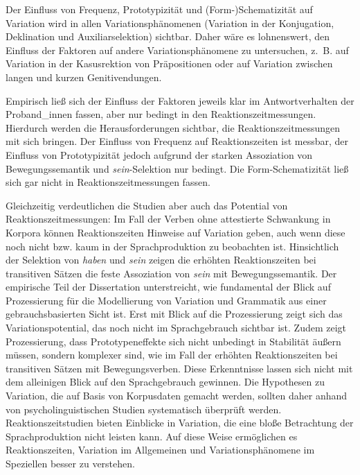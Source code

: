Der Einfluss von Frequenz, Prototypizität und (Form-)Schematizität auf Variation wird in allen Variationsphänomenen (Variation in der Konjugation, Deklination und Auxiliarselektion) sichtbar. Daher wäre es lohnenswert, den Einfluss der Faktoren auf andere Variationsphänomene zu untersuchen, z.~B. auf Variation in der Kasusrektion von Präpositionen oder auf Variation zwischen langen und kurzen Genitivendungen. 

Empirisch ließ sich der Einfluss der Faktoren jeweils klar im Antwortverhalten der Proband\_innen fassen, aber nur bedingt in den Reaktionszeitmessungen. Hierdurch werden die Herausforderungen sichtbar, die Reaktionszeitmessungen mit sich bringen. Der Einfluss von Frequenz auf Reaktionszeiten ist messbar, der Einfluss von Prototypizität jedoch aufgrund der starken Assoziation von Bewegungssemantik und \textit{sein}-Selektion nur bedingt. Die Form-Schematizität ließ sich gar nicht in Reaktionszeitmessungen fassen. 

Gleichzeitig verdeutlichen die Studien aber auch das Potential von Reaktionszeitmessungen: Im Fall der Verben ohne attestierte Schwankung in Korpora können Reaktionszeiten Hinweise auf Variation geben, auch wenn diese noch nicht bzw. kaum in der Sprachproduktion zu beobachten ist. Hinsichtlich der Selektion von \textit{haben} und \textit{sein} zeigen die erhöhten Reak\-tionszeiten bei transitiven Sätzen die feste Assoziation von \textit{sein} mit Bewegungssemantik. Der empirische Teil der Dissertation unterstreicht, wie fundamental der Blick auf Prozessierung für die Modellierung von Variation und Grammatik aus einer gebrauchsbasierten Sicht ist. Erst mit Blick auf die Prozessierung zeigt sich das Variationspotential, das noch nicht im Sprachgebrauch sichtbar ist. Zudem zeigt Prozessierung, dass Prototypeneffekte sich nicht unbedingt in Stabilität äußern müssen, sondern komplexer sind, wie im Fall der erhöhten Reaktionszeiten bei transitiven Sätzen mit Bewegungsverben. Diese Erkenntnisse lassen sich nicht mit dem alleinigen Blick auf den Sprachgebrauch gewinnen. Die Hypothesen zu Variation, die auf Basis von Korpusdaten gemacht werden, sollten daher anhand von psycholinguistischen Studien systematisch überprüft werden. Reaktionszeitstudien bieten Einblicke in Variation, die eine bloße Betrachtung der Sprachproduktion nicht leisten kann. Auf diese Weise ermöglichen es Reaktionszeiten, Variation im Allgemeinen und Variationsphänomene im Speziellen besser zu verstehen.   
